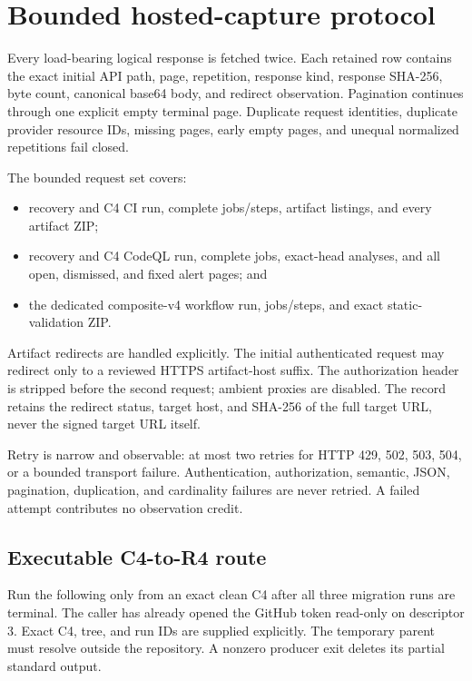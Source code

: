 \documentclass[11pt,a4paper]{article}
\begin{document}
\section{Bounded hosted-capture protocol}

Every load-bearing logical response is fetched twice. Each retained row contains the exact initial
API path, page, repetition, response kind, response SHA-256, byte count, canonical base64 body, and
redirect observation. Pagination continues through one explicit empty terminal page. Duplicate
request identities, duplicate provider resource IDs, missing pages, early empty pages, and unequal
normalized repetitions fail closed.

The bounded request set covers:

\begin{itemize}
  \item recovery and C4 CI run, complete jobs/steps, artifact listings, and every artifact ZIP;
  \item recovery and C4 CodeQL run, complete jobs, exact-head analyses, and all open, dismissed,
        and fixed alert pages; and
  \item the dedicated composite-v4 workflow run, jobs/steps, and exact static-validation ZIP.
\end{itemize}

Artifact redirects are handled explicitly. The initial authenticated request may redirect only to
a reviewed HTTPS artifact-host suffix. The authorization header is stripped before the second
request; ambient proxies are disabled. The record retains the redirect status, target host, and
SHA-256 of the full target URL, never the signed target URL itself.

Retry is narrow and observable: at most two retries for HTTP 429, 502, 503, 504, or a bounded
transport failure. Authentication, authorization, semantic, JSON, pagination, duplication, and
cardinality failures are never retried. A failed attempt contributes no observation credit.

\subsection{Executable C4-to-R4 route}

Run the following only from an exact clean C4 after all three migration runs are terminal. The
caller has already opened the GitHub token read-only on descriptor 3. Exact C4, tree, and run IDs
are supplied explicitly. The temporary parent must resolve outside the repository. A nonzero
producer exit deletes its partial standard output.
\end{document}
